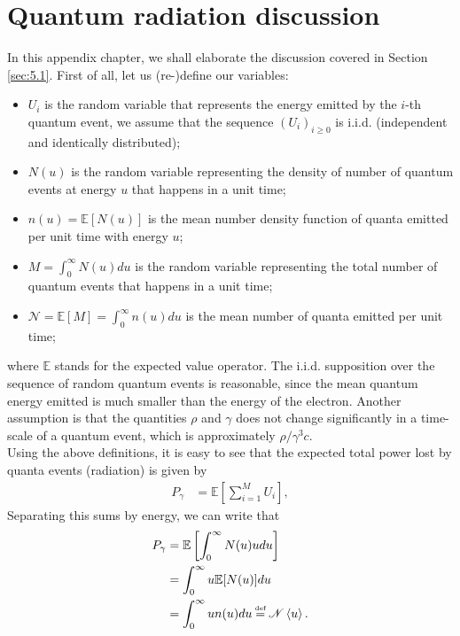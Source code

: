\section{Quantum radiation discussion} \label{sec:QuantumRadiation}

In this appendix chapter, we shall elaborate the discussion covered in Section \ref{sec:5.1}. First of all, let us (re-)define our variables:
\begin{itemize}
\item $U_i$ is the random variable that represents the energy emitted by the $i$-th quantum event, we assume that the sequence $(U_i)_{i\geq0}$ is i.i.d. (independent and identically distributed);
\item $N(u)$ is the random variable representing the density of number of quantum events at energy $u$ that happens in a unit time;
\item $n(u) = \mathbb{E}[N(u)]$ is the mean number density function of quanta emitted per unit time with energy $u$;
\item $M = \int_0^\infty N(u)du$ is the random variable representing the total number of quantum events that happens in a unit time;
\item $\mathscr{N} = \mathbb{E}[M] = \int_0^\infty n(u) du$ is the mean number of quanta emitted per unit time;
\end{itemize}
where $\mathbb{E}$ stands for the expected value operator. The i.i.d. supposition over the sequence of random quantum events is reasonable, since the mean quantum energy emitted is much smaller than the energy of the electron. Another assumption is that the quantities $\rho$ and $\gamma$ does not change significantly in a  time-scale of a quantum event, which is approximately $\rho/\gamma^3 c$. \\
Using the above definitions, it is easy to see that the expected total power lost by quanta events (radiation) is given by
\begin{align}
	P_\gamma &= \mathbb{E}\left[ \sum_{i=1}^{M} U_i \right],
\end{align}
Separating this sums by energy, we can write that
\begin{align*}
	P_\gamma &= \mathbb{E}\left[ \int_0^\infty N(u) u du \right]\\
    		&= \int_0^\infty u \mathbb{E}[N(u)] du\\
            &= \int_0^\infty u n(u) du \bydef \mathscr{N} \mean{u}.
\end{align*}

